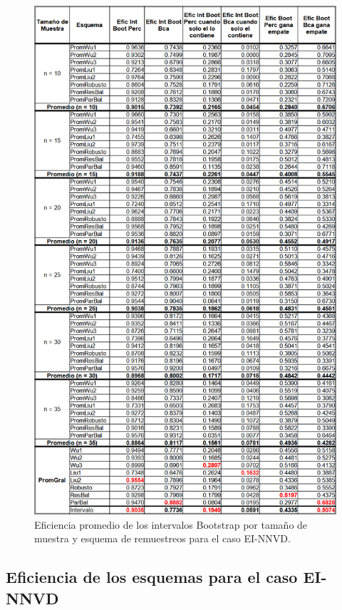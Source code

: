 \begin{figure}[ht] 
	\centering 
	\includegraphics[width=0.75\linewidth]{img/EI_NNVD_Efic_Boots.png} 
	\caption{Eficiencia promedio de los intervalos Bootstrap por tamaño de muestra y esquema de remuestreos para el caso EI-NNVD.} 
	\label{fig:EI_NNVD_Boots}
\end{figure}

\subsection{Eficiencia de los esquemas para el caso EI-NNVD}

